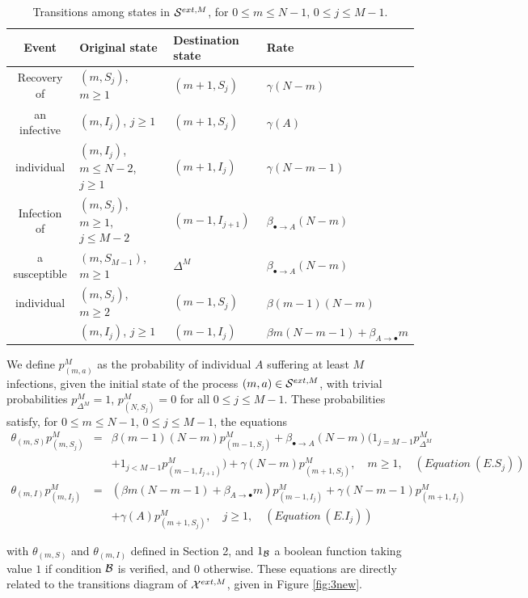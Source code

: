 \documentclass[preprint,12pt]{elsarticle}
\begin{document}
\begin{table}[h]
\centering
\begin{tabular}{|c|l|l|l|}
\hline
Event & Original state & Destination state & Rate\\
\hline
Recovery of & $(m,S_j)$, $m\geq1$ & $(m+1,S_j)$ & $\gamma(N-m)$\\
an infective & $(m,I_j)$, $j\geq1$ & $(m+1,S_j)$ & $\gamma(A)$\\
individual & $(m,I_j)$, $m\leq N-2$, $j\geq1$ & $(m+1,I_j)$ & $\gamma(N-m-1)$\\
\hline
Infection of & $(m,S_j)$, $m\geq1$, $j\leq M-2$ & $(m-1,I_{j+1})$ & $\beta_{\bullet\rightarrow A}(N-m)$\\
a susceptible & $(m,S_{M-1})$, $m\geq1$ & $\Delta^M$ & $\beta_{\bullet\rightarrow A}(N-m)$\\
individual & $(m,S_j)$, $m\geq2$ & $(m-1,S_j)$ & $\beta(m-1)(N-m)$\\
 & $(m,I_j)$, $j\geq1$ & $(m-1,I_j)$ & $\beta m(N-m-1)+\beta_{A\rightarrow\bullet}m$\\
\hline
\end{tabular}
\caption{Transitions among states in ${\cal S}^{ext,M}$, for $0\leq m\leq N-1$, $0\leq j\leq M-1$.}
\label{tab:new1}
\end{table}

\par We define $p^M_{(m,a)}$ as the probability of individual $A$ suffering at least $M$ infections, given the initial state of the process $(m,a)\in{\cal S}^{ext,M}$,
with trivial probabilities $p^M_{\Delta^M}=1$, $p^M_{(N,S_j)}=0$ for all $0\leq j\leq M-1$. These probabilities satisfy, for $0\leq m\leq N-1$, $0\leq j\leq M-1$, the equations
\vspace{1cm}
\begin{eqnarray*}
 \theta_{(m,S)}p^M_{(m,S_j)} &=& \beta(m-1)(N-m)p^M_{(m-1,S_j)}+\beta_{\bullet\rightarrow A}(N-m)(1_{j=M-1}p^M_{\Delta^M}\\
&&+1_{j<M-1}p^M_{(m-1,I_{j+1})})+\gamma(N-m)p^M_{(m+1,S_j)},\quad m\geq1,\quad (Equation\ (E.S_j))\\
\theta_{(m,I)}p^M_{(m,I_j)} &=& \left(\beta m(N-m-1)+\beta_{A\rightarrow\bullet}m\right)p^M_{(m-1,I_j)}+\gamma(N-m-1)p^M_{(m+1,I_j)}\\
&&+\gamma(A)p^M_{(m+1,S_j)},\quad j\geq 1,\quad (Equation\ (E.I_j))
\end{eqnarray*}
\par\noindent with $\theta_{(m,S)}$ and $\theta_{(m,I)}$ defined in Section 2, and $1_{\cal B}$ a boolean function taking value $1$ if condition ${\cal B}$ is verified, and $0$ otherwise. These equations are directly related to the transitions diagram of ${\cal X}^{ext,M}$, given in Figure \ref{fig:3new}.
\end{document}

